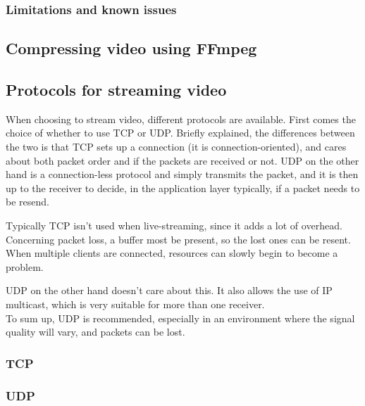 \subsubsection{Limitations and known issues}

\subsection{Compressing video using FFmpeg}


\subsection{Protocols for streaming video}
When choosing to stream video, different protocols are available. First comes the choice of whether to use TCP or UDP. Briefly explained, the differences between the two is that TCP sets up a connection (it is connection-oriented), and cares about both packet order and if the packets are received or not. UDP on the other hand is a connection-less protocol and simply transmits the packet, and it is then up to the receiver to decide, in the application layer typically, if a packet needs to be resend.

Typically TCP isn't used when live-streaming, since it adds a lot of overhead. Concerning packet loss, a buffer most be present, so the lost ones can be resent. When multiple clients are connected, resources can slowly begin to become a problem.

UDP on the other hand doesn't care about this. It also allows the use of IP multicast, which is very suitable for more than one receiver.\\

To sum up, UDP is recommended, especially in an environment where the signal quality will vary, and packets can be lost.

\subsubsection{TCP}

\subsubsection{UDP}





